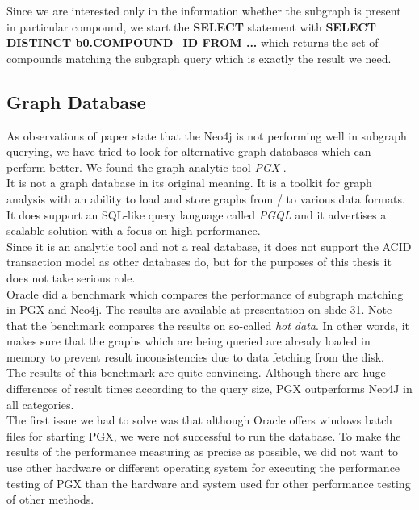 {Since we are interested only in the information whether the subgraph is present in particular compound, we start the \textbf{SELECT} statement with \textbf{SELECT DISTINCT b0.COMPOUND\_ID FROM ...} which returns the set of compounds matching the subgraph query which is exactly the result we need.

\subsection{Graph Database}

As observations of paper \cite{Hoksza} state that the Neo4j is not performing well in subgraph querying, we have tried to look for alternative graph databases which can perform better. We found the graph analytic tool \textit{PGX} \cite{pgx}.\\

It is not a graph database in its original meaning. It is a toolkit for graph analysis with an ability to load and store graphs from / to various data formats. It does support an SQL-like query language called \textit{PGQL} \cite{pgql} and it advertises a scalable solution with a focus on high performance.\\

Since it is an analytic tool and not a real database, it does not support the ACID transaction model as other databases do, but for the purposes of this thesis it does not take serious role.\\

Oracle did a benchmark which compares the performance of subgraph matching in PGX and Neo4j. The results are available at presentation \cite{pgx-neo4j} on slide 31. Note that the benchmark compares the results on so-called \textit{hot data}. In other words, it makes sure that the graphs which are being queried are already loaded in memory to prevent result inconsistencies due to data fetching from the disk.\\

The results of this benchmark are quite convincing. Although there are huge differences of result times according to the query size, PGX outperforms Neo4J in all categories.\\

The first issue we had to solve was that although Oracle offers windows batch files for starting PGX, we were not successful to run the database. To make the results of the performance measuring as precise as possible, we did not want to use other hardware or different operating system for executing the performance testing of PGX than the hardware and system used for other performance testing of other methods.\\

}
